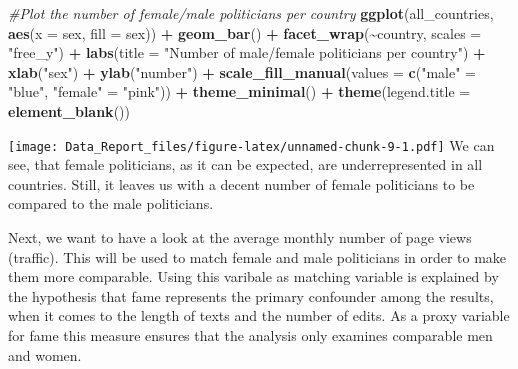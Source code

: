 \documentclass[
]{article}
\newenvironment{Shaded}{\begin{snugshade}}{\end{snugshade}}
\newcommand{\AttributeTok}[1]{\textcolor[rgb]{0.13,0.29,0.53}{#1}}
\newcommand{\CommentTok}[1]{\textcolor[rgb]{0.56,0.35,0.01}{\textit{#1}}}
\newcommand{\FunctionTok}[1]{\textcolor[rgb]{0.13,0.29,0.53}{\textbf{#1}}}
\newcommand{\NormalTok}[1]{#1}
\newcommand{\OtherTok}[1]{\textcolor[rgb]{0.56,0.35,0.01}{#1}}
\newcommand{\SpecialCharTok}[1]{\textcolor[rgb]{0.81,0.36,0.00}{\textbf{#1}}}
\newcommand{\StringTok}[1]{\textcolor[rgb]{0.31,0.60,0.02}{#1}}
\begin{document}
\begin{Shaded}
\begin{Highlighting}[]
\CommentTok{\#Plot the number of female/male politicians per country}
\FunctionTok{ggplot}\NormalTok{(all\_countries, }\FunctionTok{aes}\NormalTok{(}\AttributeTok{x =}\NormalTok{ sex, }\AttributeTok{fill =}\NormalTok{ sex)) }\SpecialCharTok{+}
  \FunctionTok{geom\_bar}\NormalTok{() }\SpecialCharTok{+}
  \FunctionTok{facet\_wrap}\NormalTok{(}\SpecialCharTok{\textasciitilde{}}\NormalTok{country, }\AttributeTok{scales =} \StringTok{"free\_y"}\NormalTok{) }\SpecialCharTok{+}
  \FunctionTok{labs}\NormalTok{(}\AttributeTok{title =} \StringTok{"Number of male/female politicians per country"}\NormalTok{) }\SpecialCharTok{+}
  \FunctionTok{xlab}\NormalTok{(}\StringTok{"sex"}\NormalTok{) }\SpecialCharTok{+}
  \FunctionTok{ylab}\NormalTok{(}\StringTok{"number"}\NormalTok{) }\SpecialCharTok{+}
  \FunctionTok{scale\_fill\_manual}\NormalTok{(}\AttributeTok{values =} \FunctionTok{c}\NormalTok{(}\StringTok{"male"} \OtherTok{=} \StringTok{"blue"}\NormalTok{, }\StringTok{"female"} \OtherTok{=} \StringTok{"pink"}\NormalTok{)) }\SpecialCharTok{+}
  \FunctionTok{theme\_minimal}\NormalTok{() }\SpecialCharTok{+}
  \FunctionTok{theme}\NormalTok{(}\AttributeTok{legend.title =} \FunctionTok{element\_blank}\NormalTok{())}
\end{Highlighting}
\end{Shaded}

\texttt{[image: Data\_Report\_files/figure-latex/unnamed-chunk-9-1.pdf]}
We can see, that female politicians, as it can be expected, are
underrepresented in all countries. Still, it leaves us with a decent
number of female politicians to be compared to the male politicians.

Next, we want to have a look at the average monthly number of page views
(traffic). This will be used to match female and male politicians in
order to make them more comparable. Using this varibale as matching
variable is explained by the hypothesis that fame represents the primary
confounder among the results, when it comes to the length of texts and
the number of edits. As a proxy variable for fame this measure ensures
that the analysis only examines comparable men and women.
\end{document}
